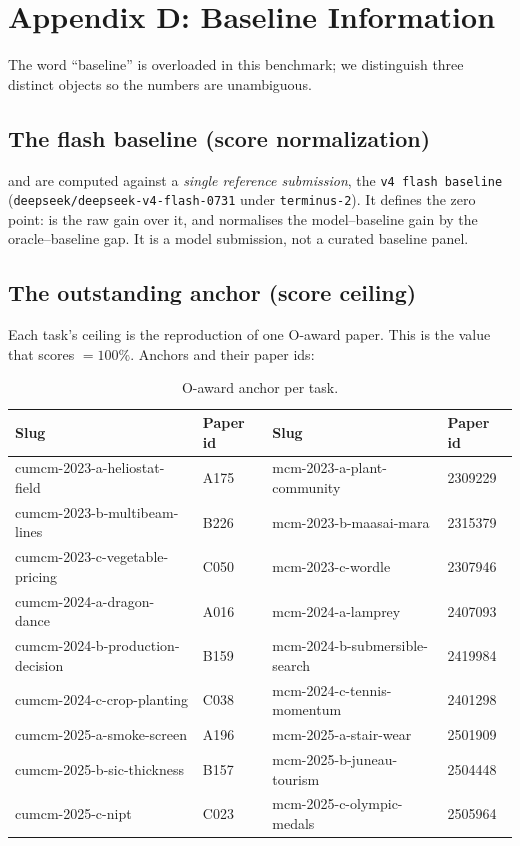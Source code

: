 \section{Appendix D: Baseline Information}
\label{app:baselines}

The word ``baseline'' is overloaded in this benchmark; we distinguish three
distinct objects so the numbers are unambiguous.

\subsection{The flash baseline (score normalization)}
\beval{} and \roeval{} are computed against a \emph{single reference submission},
the \texttt{v4 flash baseline} (\texttt{deepseek/deepseek-v4-flash-0731} under
\texttt{terminus-2}). It defines the zero point: \beval{} is the raw gain over
it, and \roeval{} normalises the model--baseline gain by the
oracle--baseline gap. It is a model submission, not a curated baseline panel.

\subsection{The outstanding anchor (score ceiling)}
Each task's ceiling is the reproduction of one O-award paper. This is the value
that scores \oeval{}$=100\%$. Anchors and their paper ids:

\begin{table}[h]
\centering
\small
\caption{O-award anchor per task.}
\label{tab:app-anchors}
\begin{tabular}{@{}llll@{}}
\toprule
Slug & Paper id & Slug & Paper id \\
\midrule
cumcm-2023-a-heliostat-field   & A175    & mcm-2023-a-plant-community    & 2309229 \\
cumcm-2023-b-multibeam-lines   & B226    & mcm-2023-b-maasai-mara        & 2315379 \\
cumcm-2023-c-vegetable-pricing & C050    & mcm-2023-c-wordle             & 2307946 \\
cumcm-2024-a-dragon-dance      & A016    & mcm-2024-a-lamprey            & 2407093 \\
cumcm-2024-b-production-decision& B159   & mcm-2024-b-submersible-search & 2419984 \\
cumcm-2024-c-crop-planting     & C038    & mcm-2024-c-tennis-momentum    & 2401298 \\
cumcm-2025-a-smoke-screen      & A196    & mcm-2025-a-stair-wear         & 2501909 \\
cumcm-2025-b-sic-thickness     & B157    & mcm-2025-b-juneau-tourism     & 2504448 \\
cumcm-2025-c-nipt              & C023    & mcm-2025-c-olympic-medals     & 2505964 \\
\bottomrule
\end{tabular}
\end{table}

